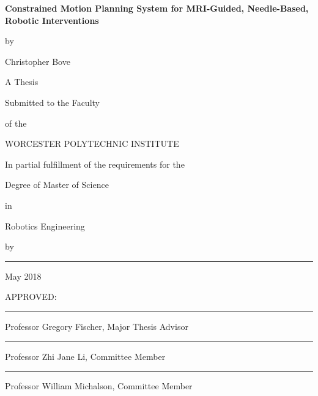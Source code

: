 \documentclass[12pt]{report}
\begin{document}
\newcommand{\brk}{\vspace*{0.18in}}

\thispagestyle{empty} %

\begin{center} %

\brk


   {\large 
	\textbf{
	Constrained Motion Planning System for MRI-Guided, Needle-Based, Robotic Interventions
	}
   }


\brk
by

\brk
Christopher Bove %


\brk\brk
A Thesis

\brk
Submitted to the Faculty

\brk
of the 

\brk
WORCESTER POLYTECHNIC INSTITUTE
	
\brk
In partial fulfillment of the requirements for the

\brk
Degree of Master of Science

\brk
in

\brk
Robotics Engineering

\brk
by

\brk\brk
\rule{3in}{1.2pt} %

\brk
May 2018

\end{center}

	
\vfill
APPROVED:

\vspace{0.25in}
\rule{3in}{0.8pt}

Professor Gregory Fischer, Major Thesis Advisor

\vspace{0.25in}
\rule{3in}{0.8pt}

Professor Zhi Jane Li, Committee Member

\vspace{0.25in}
\rule{3in}{0.8pt}

Professor William Michalson, Committee Member

\newpage %

\doublespacing
\end{document}

